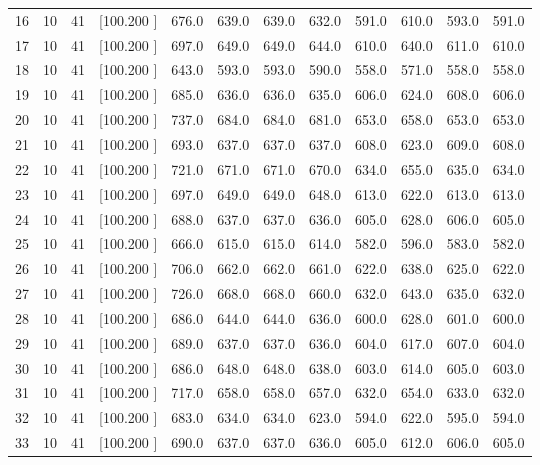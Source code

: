 \documentclass[12pt,a4paper]{article}
\begin{document}
\begin{center}
{\begin{tabular}{r r r r r r r r r r r r}
  16& 10& 41&[100.200   ]&   676.0&   639.0&   639.0&   632.0&   591.0&   610.0&   593.0&   591.0\\[-0.02in]
  17& 10& 41&[100.200   ]&   697.0&   649.0&   649.0&   644.0&   610.0&   640.0&   611.0&   610.0\\[-0.02in]
  18& 10& 41&[100.200   ]&   643.0&   593.0&   593.0&   590.0&   558.0&   571.0&   558.0&   558.0\\[-0.02in]
  19& 10& 41&[100.200   ]&   685.0&   636.0&   636.0&   635.0&   606.0&   624.0&   608.0&   606.0\\[-0.02in]
  20& 10& 41&[100.200   ]&   737.0&   684.0&   684.0&   681.0&   653.0&   658.0&   653.0&   653.0\\[-0.02in]
  21& 10& 41&[100.200   ]&   693.0&   637.0&   637.0&   637.0&   608.0&   623.0&   609.0&   608.0\\[-0.02in]
  22& 10& 41&[100.200   ]&   721.0&   671.0&   671.0&   670.0&   634.0&   655.0&   635.0&   634.0\\[-0.02in]
  23& 10& 41&[100.200   ]&   697.0&   649.0&   649.0&   648.0&   613.0&   622.0&   613.0&   613.0\\[-0.02in]
  24& 10& 41&[100.200   ]&   688.0&   637.0&   637.0&   636.0&   605.0&   628.0&   606.0&   605.0\\[-0.02in]
  25& 10& 41&[100.200   ]&   666.0&   615.0&   615.0&   614.0&   582.0&   596.0&   583.0&   582.0\\[-0.02in]
  26& 10& 41&[100.200   ]&   706.0&   662.0&   662.0&   661.0&   622.0&   638.0&   625.0&   622.0\\[-0.02in]
  27& 10& 41&[100.200   ]&   726.0&   668.0&   668.0&   660.0&   632.0&   643.0&   635.0&   632.0\\[-0.02in]
  28& 10& 41&[100.200   ]&   686.0&   644.0&   644.0&   636.0&   600.0&   628.0&   601.0&   600.0\\[-0.02in]
  29& 10& 41&[100.200   ]&   689.0&   637.0&   637.0&   636.0&   604.0&   617.0&   607.0&   604.0\\[-0.02in]
  30& 10& 41&[100.200   ]&   686.0&   648.0&   648.0&   638.0&   603.0&   614.0&   605.0&   603.0\\[-0.02in]
  31& 10& 41&[100.200   ]&   717.0&   658.0&   658.0&   657.0&   632.0&   654.0&   633.0&   632.0\\[-0.02in]
  32& 10& 41&[100.200   ]&   683.0&   634.0&   634.0&   623.0&   594.0&   622.0&   595.0&   594.0\\[-0.02in]
  33& 10& 41&[100.200   ]&   690.0&   637.0&   637.0&   636.0&   605.0&   612.0&   606.0&   605.0\\[-0.02in]

\end{tabular}}
\end{center}
\end{document}
